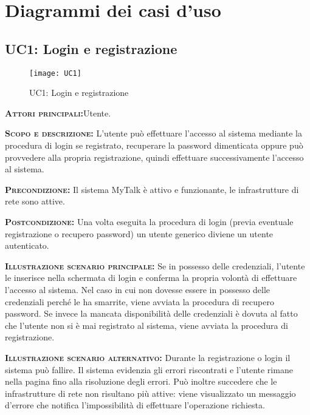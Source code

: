 \newpage\section{Diagrammi dei casi d'uso}

\subsection{UC1: Login e registrazione}
\begin{figure}[h!]
\centering
\texttt{[image: UC1]}
\caption{UC1: Login e registrazione}\label{UC1}
\end{figure}
\begin{description}
\item{\scshape\bfseries Attori principali:}Utente.
\item{\scshape\bfseries Scopo e descrizione:} L'utente può effettuare l'accesso al sistema mediante la procedura di login se registrato, recuperare la password dimenticata oppure può provvedere alla propria registrazione, quindi effettuare successivamente l'accesso al sistema.
\item{\scshape\bfseries Precondizione:} Il sistema MyTalk è attivo e funzionante, le infrastrutture di rete sono attive.
\item{\scshape\bfseries Postcondizione:} Una volta eseguita la procedura di login (previa eventuale registrazione o recupero password) un utente generico diviene un utente autenticato.
\item{\scshape\bfseries Illustrazione scenario principale:} Se in possesso delle credenziali, l'utente le inserisce nella schermata di login e conferma la propria volontà di effettuare l'accesso al sistema. Nel caso in cui non dovesse essere in possesso delle credenziali perché le ha smarrite, viene avviata la procedura di recupero password. Se invece la mancata disponibilità delle credenziali è dovuta al fatto che l'utente non si è mai registrato al sistema, viene avviata la procedura di registrazione.
\item{\scshape\bfseries Illustrazione scenario alternativo:} Durante la registrazione o login il sistema può fallire. Il sistema evidenzia gli errori riscontrati e l'utente rimane nella pagina fino alla risoluzione degli errori. Può inoltre succedere che le infrastrutture di rete non risultano più attive: viene visualizzato un messaggio d'errore che notifica l'impossibilità di effettuare l'operazione richiesta.
\end{description}

